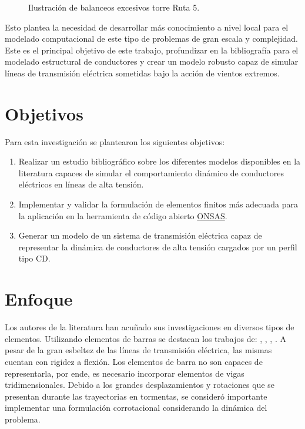 \begin{figure}[htbp]
	\centering
	\def\svgwidth{80mm}
	
	\caption{Ilustración de balanceos excesivos torre Ruta 5.}
	\label{fig:INTRO:IlusExcesiveBalance}
\end{figure}  


Esto plantea la necesidad de desarrollar más conocimiento a nivel local para el modelado computacional de este tipo de problemas de gran escala y complejidad. Este es el principal objetivo de este trabajo, profundizar en la bibliografía para el modelado estructural de conductores y crear un modelo robusto capaz de simular líneas de transmisión eléctrica sometidas bajo la acción de vientos extremos.


\section{Objetivos}\label{Sec:Intro:Objetivos}
Para esta investigación se plantearon los siguientes objetivos:
\begin{enumerate}
	\item Realizar un estudio bibliográfico sobre los diferentes modelos disponibles en la literatura capaces de simular el comportamiento dinámico de conductores eléctricos en líneas de alta tensión. 
	\item Implementar y validar la formulación de elementos finitos más adecuada para la aplicación en la herramienta de código abierto \href{https://github.com/ONSAS/ONSAS.m}{ONSAS}.
	\item Generar un modelo de un sistema de transmisión eléctrica capaz de representar la dinámica de conductores de alta tensión cargados por un perfil tipo CD.
\end{enumerate}

\section{Enfoque}

Los autores de la literatura han acuñado sus investigaciones en diversos tipos de elementos. Utilizando elementos de barras se destacan los trabajos de: \cite{desai1995finite}, \cite{yan2009numerical}, \cite{gani2010dynamic}, \cite{yang2016nonlinear}. A pesar de la gran esbeltez de las líneas de transmisión eléctrica, las mismas cuentan con rigidez a flexión. Los elementos de barra no son capaces de representarla, por ende, es necesario incorporar elementos de vigas tridimensionales. Debido a los grandes desplazamientos y rotaciones que se presentan durante las trayectorias en tormentas, se consideró importante implementar una formulación corrotacional considerando la dinámica del problema.

